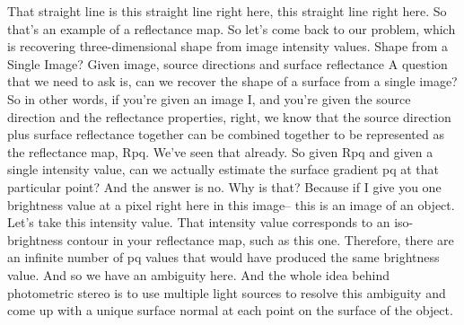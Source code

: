 \documentclass[12pt]{article}
\begin{document}
That straight line is this straight line right here,
this straight line right here.
So that's an example of a reflectance map.
So let's come back to our problem, which
is recovering three-dimensional shape from image intensity
values.
Shape from a Single Image? Given image, source directions and surface reflectance
A question that we need to ask is, can we
recover the shape of a surface from a single image?
So in other words, if you're given an image I,
and you're given the source direction
and the reflectance properties, right, we
know that the source direction plus surface reflectance
together can be combined together
to be represented as the reflectance map, Rpq.
We've seen that already.
So given Rpq and given a single intensity value,
can we actually estimate the surface gradient pq
at that particular point?
And the answer is no.
Why is that?
Because if I give you one brightness
value at a pixel right here in this image--
this is an image of an object.
Let's take this intensity value.
That intensity value corresponds to an iso-brightness contour
in your reflectance map, such as this one.
Therefore, there are an infinite number of pq values
that would have produced the same brightness value.
And so we have an ambiguity here.
And the whole idea behind photometric stereo
is to use multiple light sources to resolve this ambiguity
and come up with a unique surface normal at each point
on the surface of the object.
\end{document}

